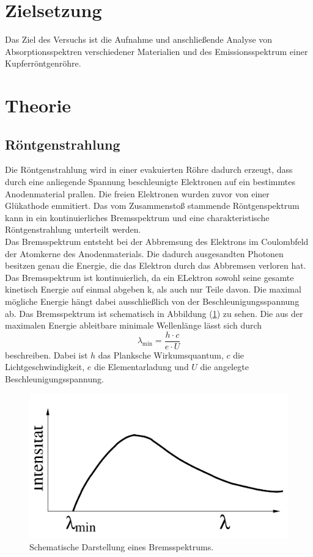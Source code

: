 \section{Zielsetzung}
\label{sec:Zielsetzung}
Das Ziel des Versuchs ist die Aufnahme und anschließende Analyse von Absorptionsspektren verschiedener Materialien und des Emissionsspektrum einer 
Kupferröntgenröhre.
\section{Theorie}
\label{sec:Theorie}
\subsection{Röntgenstrahlung}
Die Röntgenstrahlung wird in einer evakuierten Röhre dadurch erzeugt, dass durch eine anliegende Spannung beschleunigte Elektronen auf ein bestimmtes Anodenmaterial prallen. Die freien Elektronen
wurden zuvor von einer Glükathode emmitiert. Das vom Zusammenstoß stammende Röntgenspektrum kann in ein kontinuierliches Bremsspektrum und eine charakteristische 
Röntgenstrahlung unterteilt werden. \\
Das Bremsspektrum entsteht bei der Abbremsung des Elektrons im Coulombfeld der Atomkerne des Anodenmaterials. Die dadurch ausgesandten Photonen besitzen genau die 
Energie, die das Elektron durch das Abbremsen verloren hat. Das Bremsspektrum ist kontinuierlich, da ein ELektron sowohl seine gesamte kinetisch Energie auf einmal abgeben
k, als auch nur Teile davon. Die maximal mögliche Energie hängt dabei ausschließlich von der Beschleunigungsspannung ab. Das Bremsspektrum ist 
schematisch in Abbildung (\ref{fig:Bremsspektrum}) zu sehen. Die aus der maximalen Energie ableitbare minimale Wellenlänge lässt
sich durch 
\begin{equation}
    \lambda_{\text{min}} = \frac{h \cdot c}{e \cdot U}
\end{equation}
beschreiben. Dabei ist $h$ das Planksche Wirkumsquantum, $c$ die Lichtgeschwindigkeit, $e$ die Elementarladung und $U$ die angelegte Beschleunigungsspannung.\\
\begin{figure}[H]
    \centering
    \includegraphics[width=\textwidth/2]{content/Bilder/Bremsspektrum.jpeg}
    \caption{Schematische Darstellung eines Bremsspektrums.}
    \label{fig:Bremsspektrum}
\end{figure}

